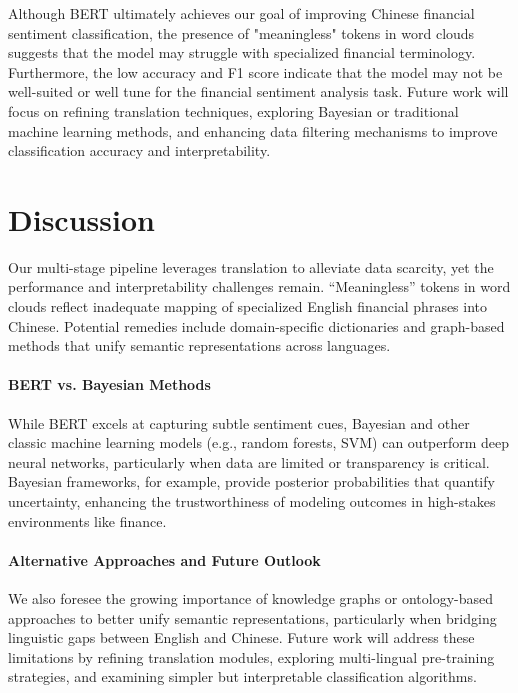 \documentclass[12pt]{article}
\begin{document}
Although BERT ultimately achieves our goal of improving Chinese financial sentiment classification, the presence of "meaningless" tokens in word clouds suggests that the model may struggle with specialized financial terminology. Furthermore, the low accuracy and F1 score indicate that the model may not be well-suited or well tune for the financial sentiment analysis task. Future work will focus on refining translation techniques, exploring Bayesian or traditional machine learning methods, and enhancing data filtering mechanisms to improve classification accuracy and interpretability.

\section{Discussion}
\label{sec:discussion}

Our multi-stage pipeline leverages translation to alleviate data scarcity, yet the performance and interpretability challenges remain. “Meaningless” tokens in word clouds reflect inadequate mapping of specialized English financial phrases into Chinese. Potential remedies include domain-specific dictionaries and graph-based methods that unify semantic representations across languages.

\paragraph{BERT vs. Bayesian Methods}
While BERT excels at capturing subtle sentiment cues, Bayesian and other classic machine learning models (e.g., random forests, SVM) can outperform deep neural networks, particularly when data are limited or transparency is critical. Bayesian frameworks, for example, provide posterior probabilities that quantify uncertainty, enhancing the trustworthiness of modeling outcomes in high-stakes environments like finance.

\paragraph{Alternative Approaches and Future Outlook}
We also foresee the growing importance of knowledge graphs or ontology-based approaches to better unify semantic representations, particularly when bridging linguistic gaps between English and Chinese. Future work will address these limitations by refining translation modules, exploring multi-lingual pre-training strategies, and examining simpler but interpretable classification algorithms.
\end{document}
